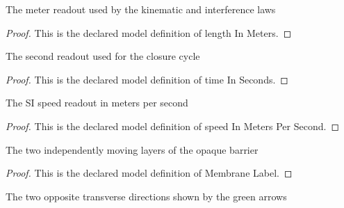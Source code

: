 \begin{definition}
  \label{def:physics:phyx-mini-0124:phyxminiproblems-problemphyxmini0124-lengthinmeters}
  The meter readout used by the kinematic and interference laws
\end{definition}
\begin{proof}
  This is the declared model definition of length In Meters.
\end{proof}
\begin{definition}
  \label{def:physics:phyx-mini-0124:phyxminiproblems-problemphyxmini0124-timeinseconds}
  The second readout used for the closure cycle
\end{definition}
\begin{proof}
  This is the declared model definition of time In Seconds.
\end{proof}
\begin{definition}
  \label{def:physics:phyx-mini-0124:phyxminiproblems-problemphyxmini0124-speedinmeterspersecond}
  The SI speed readout in meters per second
\end{definition}
\begin{proof}
  This is the declared model definition of speed In Meters Per Second.
\end{proof}
\begin{definition}
  \label{def:physics:phyx-mini-0124:phyxminiproblems-problemphyxmini0124-membranelabel}
  The two independently moving layers of the opaque barrier
\end{definition}
\begin{proof}
  This is the declared model definition of Membrane Label.
\end{proof}
\begin{definition}
  \label{def:physics:phyx-mini-0124:phyxminiproblems-problemphyxmini0124-verticaldirection}
  The two opposite transverse directions shown by the green arrows
\end{definition}
